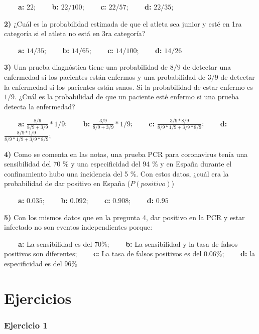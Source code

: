 \documentclass[
]{book}
\begin{document}
\textbf{\(\qquad\)a:} \(22\); \textbf{\(\qquad\)b:} \(22/100\); \textbf{\(\qquad\)c:} \(22/57\); \textbf{\(\qquad\)d:} \(22/35\);

\textbf{2)} ¿Cuál es la probabilidad estimada de que el atleta sea junior y esté en 1ra categoría si el atleta no está en 3ra categoría?

\textbf{\(\qquad\)a:} \(14/35\); \textbf{\(\qquad\)b:} \(14/65\); \textbf{\(\qquad\)c:} \(14/100\); \textbf{\(\qquad\)d:} \(14/26\)

\textbf{3)} Una prueba diagnóstica tiene una probabilidad de \(8/9\) de detectar una enfermedad si los pacientes están enfermos y una probabilidad de \(3/9\) de detectar la enfermedad si los pacientes están sanos. Si la probabilidad de estar enfermo es \(1/9\). ¿Cuál es la probabilidad de que un paciente esté enfermo si una prueba detecta la enfermedad?

\textbf{\(\qquad\)a:} \(\frac{8/9}{8/9+3/9}*1/9\); \textbf{\(\qquad\)b:} \(\frac{3/9}{8/9+3/9}*1/9\); \textbf{\(\qquad\)c:} \(\frac{3/9*8/9}{8/9*1/9+3/9*8/9}\); \textbf{\(\qquad\)d:} \(\frac{8/9*1/9}{8/9*1/9+3/9*8/9}\);

\textbf{4)} Como se comenta en las notas, una prueba PCR para coronavirus tenía una sensibilidad del 70 \% y una especificidad del 94 \% y en España durante el confinamiento hubo una incidencia del 5 \%. Con estos datos, ¿cuál era la probabilidad de dar positivo en España (\(P(positivo)\))

\textbf{\(\qquad\)a:} \(0.035\); \textbf{\(\qquad\)b:} \(0.092\); \textbf{\(\qquad\)c:} \(0.908\); \textbf{\(\qquad\)d:} \(0.95\)

\textbf{5)} Con los mismos datos que en la pregunta 4, dar positivo en la PCR y estar infectado no son eventos independientes porque:

\textbf{\(\qquad\)a:} La sensibilidad es del 70\%; \textbf{\(\qquad\)b:} La sensibilidad y la tasa de falsos positivos son diferentes; \textbf{\(\qquad\)c:} La tasa de falsos positivos es del 0.06\%; \textbf{\(\qquad\)d:} la especificidad es del 96\%

\hypertarget{ejercicios-2}{%
\section{Ejercicios}\label{ejercicios-2}}

\hypertarget{ejercicio-1-1}{%
\subsubsection{Ejercicio 1}\label{ejercicio-1-1}}
\end{document}
